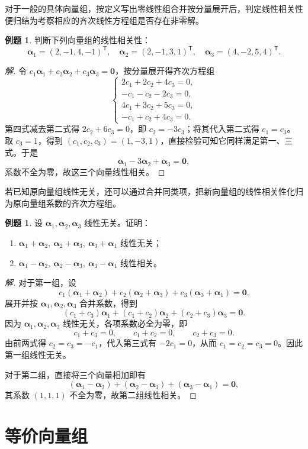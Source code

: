 \documentclass[UTF8, fontset=fandol, a4paper, 12pt]{ctexart}
\newcommand{\va}{\boldsymbol\alpha}
\newcommand{\vo}{\boldsymbol0}
\theoremstyle{definition}
\newtheorem{example}[definition]{例题}
\begin{document}
对于一般的具体向量组，按定义写出零线性组合并按分量展开后，判定线性相关性便归结为考察相应的齐次线性方程组是否存在非零解。

\begin{example}\label{ex:three}
判断下列向量组的线性相关性：
\[
 \va_1=(2,-1,4,-1)^{\mathsf T},\quad
 \va_2=(2,-1,3,1)^{\mathsf T},\quad
 \va_3=(4,-2,5,4)^{\mathsf T}.
\]
\end{example}
\begin{proof}[解]
令 $c_1\va_1+c_2\va_2+c_3\va_3=\vo$，按分量展开得齐次方程组
\[
 \begin{cases}
 2c_1+2c_2+4c_3=0,\\
 -c_1-c_2-2c_3=0,\\
 4c_1+3c_2+5c_3=0,\\
 -c_1+c_2+4c_3=0.
 \end{cases}
\]
第四式减去第二式得 $2c_2+6c_3=0$，即 $c_2=-3c_3$；将其代入第二式得 $c_1=c_3$。取 $c_3=1$，得到 $(c_1,c_2,c_3)=(1,-3,1)$，直接检验可知它同样满足第一、三式。于是
\[
 \va_1-3\va_2+\va_3=\vo,
\]
系数不全为零，故这三个向量线性相关。
\end{proof}

若已知原向量组线性无关，还可以通过合并同类项，把新向量组的线性相关性化归为原向量组系数的齐次方程组。

\begin{example}
设 $\va_1,\va_2,\va_3$ 线性无关。证明：
\begin{enumerate}
 \item $\va_1+\va_2,\ \va_2+\va_3,\ \va_3+\va_1$ 线性无关；
 \item $\va_1-\va_2,\ \va_2-\va_3,\ \va_3-\va_1$ 线性相关。
\end{enumerate}
\end{example}
\begin{proof}[解]
对于第一组，设
\[
 c_1(\va_1+\va_2)+c_2(\va_2+\va_3)+c_3(\va_3+\va_1)=\vo.
\]
展开并按 $\va_1,\va_2,\va_3$ 合并系数，得到
\[
 (c_1+c_3)\va_1+(c_1+c_2)\va_2+(c_2+c_3)\va_3=\vo.
\]
因为 $\va_1,\va_2,\va_3$ 线性无关，各项系数必全为零，即
\[
 c_1+c_3=0,\qquad c_1+c_2=0,\qquad c_2+c_3=0.
\]
由前两式得 $c_2=c_3=-c_1$，代入第三式有 $-2c_1=0$，从而 $c_1=c_2=c_3=0$。因此第一组线性无关。

对于第二组，直接将三个向量相加即有
\[
 (\va_1-\va_2)+(\va_2-\va_3)+(\va_3-\va_1)=\vo,
\]
其系数 $(1,1,1)$ 不全为零，故第二组线性相关。
\end{proof}

\section{等价向量组}
\end{document}
